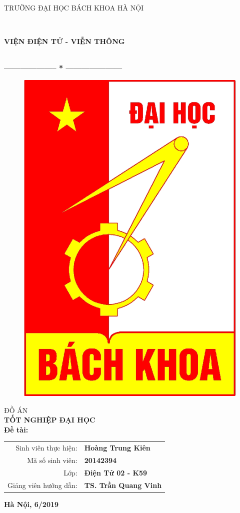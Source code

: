 \thispagestyle{empty}
\thisfancypage{
\setlength{\fboxsep}{0pt}
\fbox}{} 
\begin{center}
\begin{large}
TRƯỜNG ĐẠI HỌC BÁCH KHOA HÀ NỘI
\end{large}\\ \vspace{0.2cm}
\begin{large}
\textbf{VIỆN ĐIỆN TỬ - VIỄN THÔNG}
\end{large} \\
\textbf{--------------------  *  ---------------------}\\[0.5cm]
\begin{figure}[h!]
		\centering
		\includegraphics[width=0.18\linewidth]{image/logobk}
\end{figure}
 \vspace{1cm}

{\fontsize{18pt}{1} \textsc{ĐỒ ÁN}}\\ %
\vspace{0.5cm}
{\fontsize{24pt}{1} \textbf{TỐT NGHIỆP ĐẠI HỌC}}\\[2cm] %
\flushleft \hspace{0.1cm} \fontsize{12pt}{1} \textbf{Đề tài:\\}
\vspace{0.3cm}
\end{center}
\vspace{2cm}
\begin{table}[!htp]
    \centering
    \renewcommand{\arraystretch}{1.2}
    \begin{tabular}{ r l}    
    
    	 Sinh viên thực hiện: & \textbf{Hoàng Trung Kiên} \\
    	 Mã số sinh viên: & \textbf{20142394} \\
    	 Lớp: & \textbf{Điện Tử 02 - K59} \\
    	 Giảng viên hướng dẫn: & \textbf{TS. Trần Quang Vinh} \\
    \end{tabular}
\end{table}


\vspace{2cm}
\begin{center}
{\fontsize{12pt}{1}\textbf{Hà Nội, 6/2019}}\\
\end{center}

